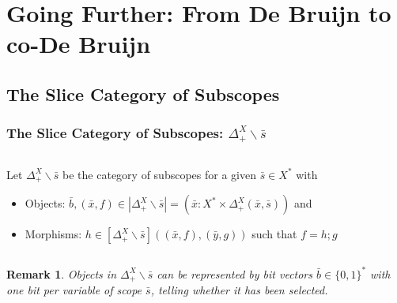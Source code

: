 \documentclass[aspectratio=169]{beamer}
\theoremstyle{remarkstyle}
\newtheorem*{remark}{Remark}
\begin{document}
\section{Going Further: From De Bruijn to co-De Bruijn}
\subsection{The Slice Category of Subscopes}

\begin{frame}[fragile]
  \frametitle{The Slice Category of Subscopes: $Δ_+^X∖\bar{s}$}
  \begin{definition}
    \begin{columns}
      \begin{column}{0.68\textwidth}
        Let $Δ_+^X∖\bar{s}$ be the category of subscopes for a given $\bar{s} ∈ X^*$ with 
        \begin{itemize}
          \item Objects: $\bar{b}, (\bar{x}, f) ∈ |Δ_+^X∖\bar{s}| = \left(\bar{x} : X^* × Δ_+^X(\bar{x}, \bar{s}) \right)$ and
          \item Morphisms: $h ∈ [Δ_+^X∖\bar{s}]((\bar{x}, f), (\bar{y}, g))$ such that $f = h;g$ 
        \end{itemize}
      \end{column}
      \begin{column}{0.3\textwidth}
      \end{column}
    \end{columns}
    
  \end{definition}
  \begin{remark}
    Objects in $Δ_+^X∖\bar{s}$ can be represented by \emph{bit vectors} $\bar{b} ∈ \{0, 1\}^*$ with one bit per variable of scope $\bar{s}$, telling whether it has been selected.
  \end{remark}
\end{frame}
\end{document}
